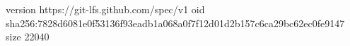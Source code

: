version https://git-lfs.github.com/spec/v1
oid sha256:7828d6081e0f53136f93eadb1a068a0f7f12d01d2b157c6ca29bc62ec0fe9147
size 22040
